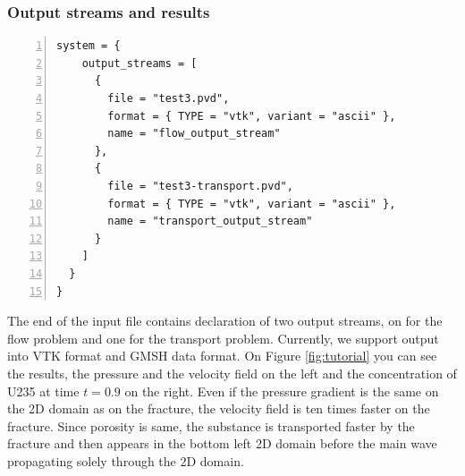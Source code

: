 \documentclass[12pt,a4paper]{report}
\begin{document}
\subsubsection{Output streams and results}
\begin{Verbatim}[numbers=left, firstnumber=last]
  system = {
    output_streams = [
      {
        file = "test3.pvd", 
        format = { TYPE = "vtk", variant = "ascii" },
        name = "flow_output_stream"
      }, 
      {
        file = "test3-transport.pvd", 
        format = { TYPE = "vtk", variant = "ascii" },
        name = "transport_output_stream"
      }
    ]
  }
} 
\end{Verbatim}
The end of the input file contains declaration of two output streams, on for the flow problem and one for the transport problem. Currently, we support output into VTK format and GMSH data format.
On Figure \ref{fig:tutorial} you can see the results, the pressure and the velocity field on the left and the concentration of U235 at time $t=0.9$ on the right. Even if the pressure gradient is
the same on the 2D domain as on the fracture, the velocity field is ten times faster on the fracture. Since porosity is same, the substance is transported faster by the fracture and
then appears in the bottom left 2D domain before the main wave propagating solely through the 2D domain.
\end{document}
